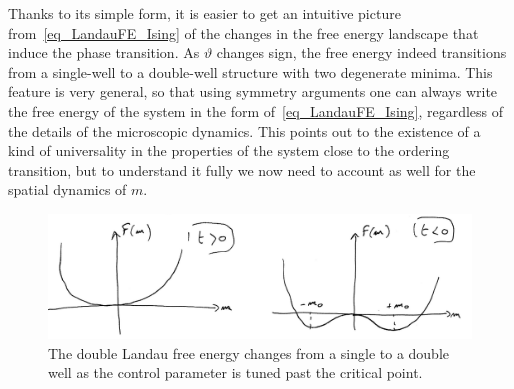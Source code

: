 Thanks to its simple form, it is easier to get an intuitive picture from~\eqref{eq_LandauFE_Ising} of the changes in the free energy landscape that induce the phase transition.
As $\vartheta$ changes sign, the free energy indeed transitions from a single-well to a double-well structure with two degenerate minima.
This feature is very general, so that using symmetry arguments one can always write the free energy of the system in the form of~\eqref{eq_LandauFE_Ising}, regardless of the details of the microscopic dynamics.
This points out to the existence of a kind of universality in the properties of the system close to the ordering transition, but to understand it fully we now need to account as well for the spatial dynamics of $m$.

\begin{figure}[!b]
    \centering
    \includegraphics[width=.8\textwidth]{chapters/Figures/introduction/double_well.png}
    \caption{The double Landau free energy changes from a single to a double well as the control parameter is tuned past the critical point.}
    \label{fig: double well}
\end{figure}

